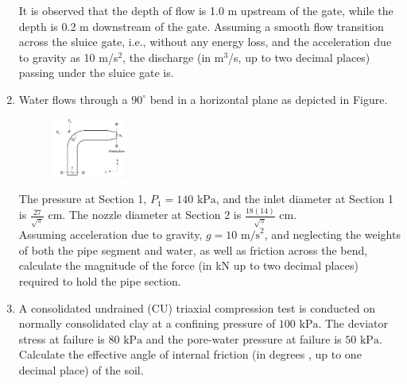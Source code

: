 \documentclass[journal]{IEEEtran}
\numberwithin{equation}{enumi}
\numberwithin{figure}{enumi}
\begin{document}
\begin{enumerate}[start=40]

It is observed that the depth of flow is 1.0 m upstream of the gate, while the depth is 0.2 m downstream of the gate. Assuming a smooth flow transition across the sluice gate, i.e., without any energy loss, and the acceleration due to gravity as 10 m/s$^2$, the discharge (in m$^3$/s, up to two decimal places) passing under the sluice gate is.
\item
Water flows through a $90^{\circ}$ bend in a horizontal plane as depicted in Figure.\\
     \begin{figure}[!ht]
    \centering
    \includegraphics[width=2.5cm]{figs/Q49.png}
    \end{figure}

The pressure at Section 1, $P_1 = 140 \text{ kPa}$, and the inlet diameter at Section 1 is $\frac{27}{\sqrt{\pi}} \text{ cm}$. The nozzle diameter at Section 2 is $\frac{18(14)}{\sqrt{\pi}} \text{ cm}$. \\
Assuming acceleration due to gravity, $g = 10 \text{ m/s}^2$, and neglecting the weights of both the pipe segment and water, as well as friction across the bend, calculate the magnitude of the force (in kN up to two decimal places) required to hold the pipe section.

\item
A consolidated undrained (CU) triaxial compression test is conducted on normally consolidated clay at a confining pressure of $100 \text{ kPa}$. The deviator stress at failure is $80 \text{ kPa}$ and the pore-water pressure at failure is $50 \text{ kPa}$. Calculate the effective angle of internal friction (in degrees , up to one decimal place) of the soil.


\end{enumerate}
\end{document}
